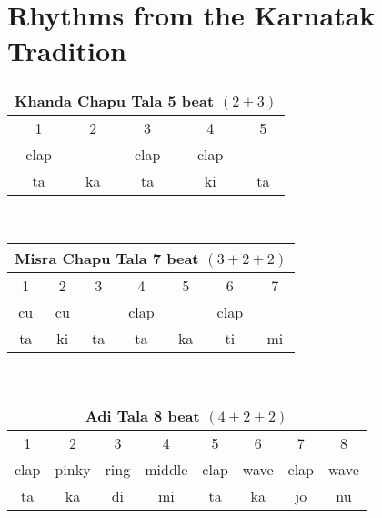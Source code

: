 \documentclass[12pt,a4paper]{article}
\begin{document}
\section{Rhythms from the Karnatak Tradition}
\begin{center}
\begin{tabular}{|cc|ccc|}
    \hline
    \multicolumn{5}{|c|}{Khanda Chapu Tala 5 beat \((2+3)\)}\\
    \hline
    1&2&3&4&5\\
    \hline
    clap&&clap&clap&\\
    \hline
    ta&ka&ta&ki&ta\\
    \hline
\end{tabular}
\end{center}
\\
\begin{center}
\begin{tabular}{|ccc|cc|cc|}
    \hline
    \multicolumn{7}{|c|}{Misra Chapu Tala 7 beat \((3+2+2)\)}\\
    \hline
    1&2&3&4&5&6&7\\
    \hline
    cu&cu&&clap&&clap&\\
    \hline
    ta&ki&ta&ta&ka&ti&mi\\
    \hline
\end{tabular}
\end{center}
\\
\begin{center}
\begin{tabular}{|cccc|cc|cc|}
    \hline
    \multicolumn{8}{|c|}{Adi Tala 8 beat \((4+2+2)\)}\\
    \hline
    1&2&3&4&5&6&7&8\\
    \hline
    clap&pinky&ring&middle&clap&wave&clap&wave\\
    \hline
    ta&ka&di&mi&ta&ka&jo&nu\\
    \hline
\end{tabular}
\end{center}
\end{document}
